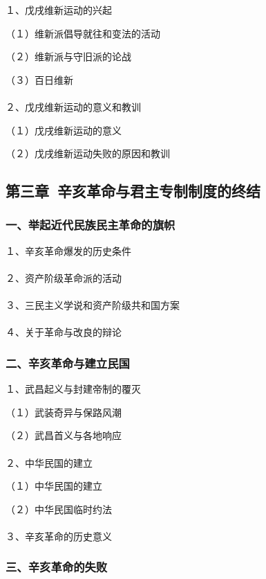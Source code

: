 \documentclass{ctexart}
\begin{document}
１、戊戌维新运动的兴起

（１）维新派倡导就往和变法的活动

（２）维新派与守旧派的论战

（３）百日维新
\\\\

２、戊戌维新运动的意义和教训

（１）戊戌维新运动的意义

（２）戊戌维新运动失败的原因和教训

\subsection{第三章\ 辛亥革命与君主专制制度的终结}

\subsubsection{一、举起近代民族民主革命的旗帜}

１、辛亥革命爆发的历史条件
\\\\

２、资产阶级革命派的活动
\\\\

３、三民主义学说和资产阶级共和国方案
\\\\

４、关于革命与改良的辩论

\subsubsection{二、辛亥革命与建立民国}

１、武昌起义与封建帝制的覆灭

（１）武装奇异与保路风潮

（２）武昌首义与各地响应
\\\\

２、中华民国的建立

（１）中华民国的建立

（２）中华民国临时约法
\\\\

３、辛亥革命的历史意义

\subsubsection{三、辛亥革命的失败}
\end{document}
